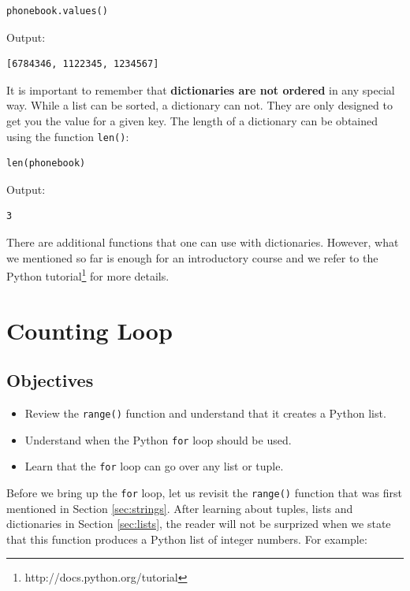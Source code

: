 \begin{verbatim}
phonebook.values()
\end{verbatim}
Output:

\begin{verbatim}
[6784346, 1122345, 1234567]
\end{verbatim}
It is important to remember that {\bf dictionaries are not ordered} in any 
special way. While a list can be sorted, a dictionary can not. They are only 
designed to get you the value for a given key. 
The length of a dictionary can be obtained using the function {\tt len()}:

\begin{verbatim}
len(phonebook)
\end{verbatim}
Output:

\begin{verbatim}
3
\end{verbatim}
There are additional functions that one can use with dictionaries. However, 
what we mentioned so far is enough for an introductory course and we refer 
to the Python tutorial\footnote{http://docs.python.org/tutorial} for more 
details.


\section{Counting Loop} \label{sec:forloop}

\subsection{Objectives}

\begin{itemize}
\item Review the {\tt range()} function and understand that it creates a Python list.
\item Understand when the Python {\tt for} loop should be used.
\item Learn that the {\tt for} loop can go over any list or tuple.
\end{itemize}
Before we bring up the {\tt for} loop, let us revisit the {\tt range()}
function that was first mentioned in Section \ref{sec:strings}. After 
learning about tuples, lists and dictionaries in Section \ref{sec:lists}, the 
reader will not be surprized when we state that this function produces 
a Python list of integer numbers. For example:

